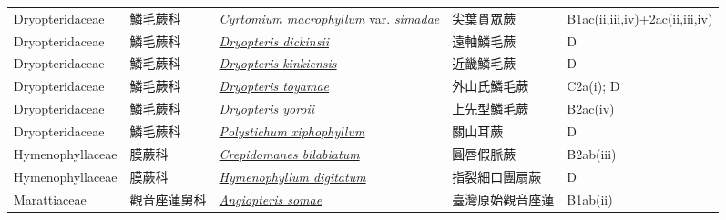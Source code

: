 {\begin{longtable}{p{2.5cm}p{2.5cm}p{4.5cm}p{2.5cm}p{3cm}}
    Dryopteridaceae & 鱗毛蕨科 & \href{http://www.theplantlist.org/tpl1.1/search?q=Cyrtomium+macrophyllum+var.+simadae}{\textit{Cyrtomium macrophyllum} var. \textit{simadae} } & 尖葉貫眾蕨 & B1ac(ii,iii,iv)+2ac(ii,iii,iv) \index{Cyrtomium@\textit{Cyrtomium}!macrophyllum@\textit{macrophyllum}!var. simadae@var. \textit{simadae}}  \index{尖葉貫眾蕨} \\
    Dryopteridaceae & 鱗毛蕨科 & \href{http://www.theplantlist.org/tpl1.1/search?q=Dryopteris+dickinsii}{\textit{Dryopteris dickinsii} } & 遠軸鱗毛蕨 & D \index{Dryopteris@\textit{Dryopteris}!dickinsii@\textit{dickinsii}}  \index{遠軸鱗毛蕨} \\
    Dryopteridaceae & 鱗毛蕨科 & \href{http://www.theplantlist.org/tpl1.1/search?q=Dryopteris+kinkiensis}{\textit{Dryopteris kinkiensis} } & 近畿鱗毛蕨 & D \index{Dryopteris@\textit{Dryopteris}!kinkiensis@\textit{kinkiensis}}  \index{近畿鱗毛蕨} \\
    Dryopteridaceae & 鱗毛蕨科 & \href{http://www.theplantlist.org/tpl1.1/search?q=Dryopteris+toyamae}{\textit{Dryopteris toyamae} } & 外山氏鱗毛蕨 & C2a(i); D \index{Dryopteris@\textit{Dryopteris}!toyamae@\textit{toyamae}}  \index{外山氏鱗毛蕨} \\
    Dryopteridaceae & 鱗毛蕨科 & \href{http://www.theplantlist.org/tpl1.1/search?q=Dryopteris+yoroii}{\textit{Dryopteris yoroii} } & 上先型鱗毛蕨 & B2ac(iv) \index{Dryopteris@\textit{Dryopteris}!yoroii@\textit{yoroii}}  \index{上先型鱗毛蕨} \\
    Dryopteridaceae & 鱗毛蕨科 & \href{http://www.theplantlist.org/tpl1.1/search?q=Polystichum+xiphophyllum}{\textit{Polystichum xiphophyllum} } & 關山耳蕨 & D \index{Polystichum@\textit{Polystichum}!xiphophyllum@\textit{xiphophyllum}}  \index{關山耳蕨} \\
    Hymenophyllaceae & 膜蕨科 & \href{http://www.theplantlist.org/tpl1.1/search?q=Crepidomanes+bilabiatum}{\textit{Crepidomanes bilabiatum} } & 圓唇假脈蕨 & B2ab(iii) \index{Crepidomanes@\textit{Crepidomanes}!bilabiatum@\textit{bilabiatum}}  \index{圓唇假脈蕨} \\
    Hymenophyllaceae & 膜蕨科 & \href{http://www.theplantlist.org/tpl1.1/search?q=Hymenophyllum+digitatum}{\textit{Hymenophyllum digitatum} } & 指裂細口團扇蕨 & D \index{Hymenophyllum@\textit{Hymenophyllum}!digitatum@\textit{digitatum}}  \index{指裂細口團扇蕨} \\
    Marattiaceae & 觀音座蓮舅科 & \href{http://www.theplantlist.org/tpl1.1/search?q=Angiopteris+somae}{\textit{Angiopteris somae} } & 臺灣原始觀音座蓮 & B1ab(ii) \index{Angiopteris@\textit{Angiopteris}!somae@\textit{somae}}  \index{臺灣原始觀音座蓮} \\

\end{longtable}}
